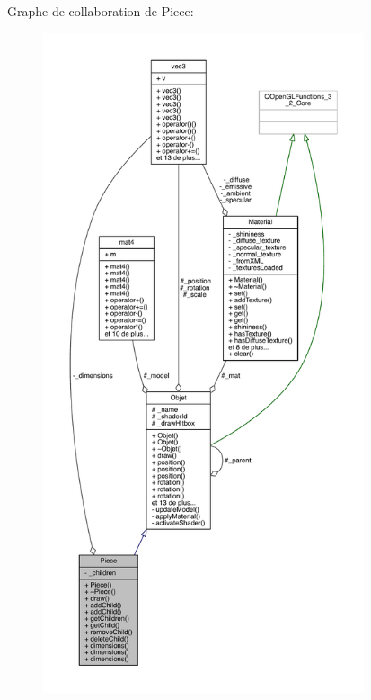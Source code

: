 Graphe de collaboration de Piece\+:
\nopagebreak
\begin{figure}[H]
\begin{center}
\leavevmode
\includegraphics[height=550pt]{class_piece__coll__graph}
\end{center}
\end{figure}
